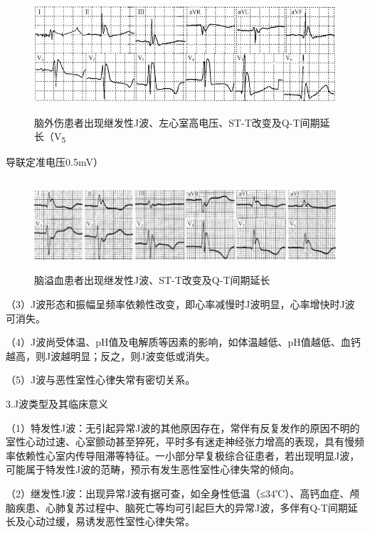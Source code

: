 \begin{figure}[!htbp]
 \centering
 \includegraphics[width=5.48958in,height=1.72917in]{./images/Image00076.jpg}
 \captionsetup{justification=centering}
 \caption{脑外伤患者出现继发性J波、左心室高电压、ST-T改变及Q-T间期延长（V\textsubscript{5}}
 \label{fig4-1}
  \end{figure} 
导联定准电压0.5mV）

\begin{figure}[!htbp]
 \centering
 \includegraphics[width=5.78125in,height=1.33333in]{./images/Image00077.jpg}
 \captionsetup{justification=centering}
 \caption{脑溢血患者出现继发性J波、ST-T改变及Q-T间期延长}
 \label{fig4-2}
  \end{figure} 

（3）J波形态和振幅呈频率依赖性改变，即心率减慢时J波明显，心率增快时J波可消失。

（4）J波尚受体温、pH值及电解质等因素的影响，如体温越低、pH值越低、血钙越高，则J波越明显；反之，则J波变低或消失。

（5）J波与恶性室性心律失常有密切关系。

3.J波类型及其临床意义

（1）特发性J波：无引起异常J波的其他原因存在，常伴有反复发作的原因不明的室性心动过速、心室颤动甚至猝死，平时多有迷走神经张力增高的表现，具有慢频率依赖性心室内传导阻滞等特征。一小部分早复极综合征患者，若出现明显J波，可能属于特发性J波的范畴，预示有发生恶性室性心律失常的倾向。

（2）继发性J波：出现异常J波有据可查，如全身性低温（≤34℃）、高钙血症、颅脑疾患、心肺复苏过程中、脑死亡等均可引起巨大的异常J波，多伴有Q-T间期延长及心动过缓，易诱发恶性室性心律失常。

\protect\hypertarget{text00010.htmlux5cux23subid69}{}{}

